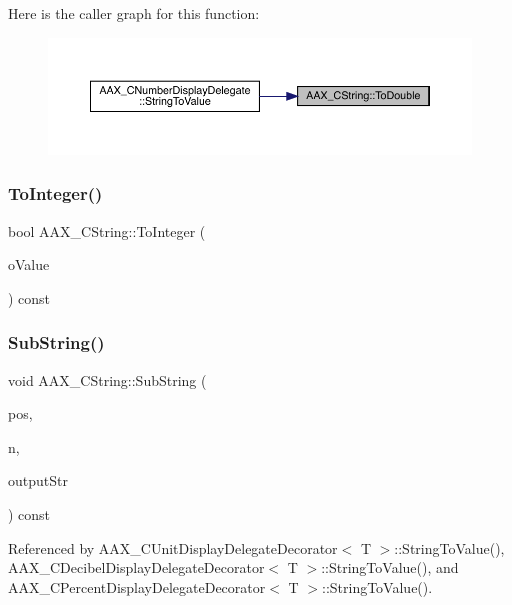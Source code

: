 Here is the caller graph for this function\+:
\nopagebreak
\begin{figure}[H]
\begin{center}
\leavevmode
\includegraphics[width=350pt]{a01573_a6dc9a81e486621fd5e3ea56df137f3d7_icgraph}
\end{center}
\end{figure}
\mbox{\label{a01573_a0bdbf112850d72fe372838e89a081d6d}} 
\subsubsection{\texorpdfstring{ToInteger()}{ToInteger()}}
{\footnotesize\ttfamily bool A\+A\+X\+\_\+\+C\+String\+::\+To\+Integer (\begin{DoxyParamCaption}\item[{int32\+\_\+t $\ast$}]{o\+Value }\end{DoxyParamCaption}) const}

\mbox{\label{a01573_a35132df5b9f73bc2ddbfd673f4a5d22a}} 
\subsubsection{\texorpdfstring{SubString()}{SubString()}}
{\footnotesize\ttfamily void A\+A\+X\+\_\+\+C\+String\+::\+Sub\+String (\begin{DoxyParamCaption}\item[{uint32\+\_\+t}]{pos,  }\item[{uint32\+\_\+t}]{n,  }\item[{\mbox{\hyperlink{a01873}{A\+A\+X\+\_\+\+I\+String}} $\ast$}]{output\+Str }\end{DoxyParamCaption}) const}



Referenced by A\+A\+X\+\_\+\+C\+Unit\+Display\+Delegate\+Decorator$<$ T $>$\+::\+String\+To\+Value(), A\+A\+X\+\_\+\+C\+Decibel\+Display\+Delegate\+Decorator$<$ T $>$\+::\+String\+To\+Value(), and A\+A\+X\+\_\+\+C\+Percent\+Display\+Delegate\+Decorator$<$ T $>$\+::\+String\+To\+Value().

